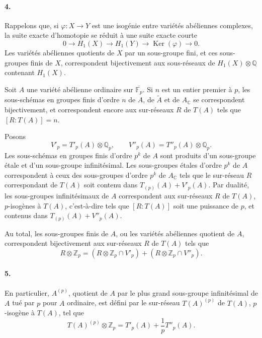 \documentclass[10pt]{article}
\newcommand{\C}{\mathbb C}
\newcommand{\Fp}{\mathbb F_p}
\newcommand{\Q}{\mathbb Q}
\newcommand{\Z}{\mathbb Z}
\newcommand{\Ac}{A_{\C}}
\newcommand{\Ker}{\operatorname{Ker}}
\begin{document}
\paragraph{4.} Rappelons que, si $\varphi:X\to Y$ est une isogénie entre variétés abéliennes complexes, la suite exacte d'homotopie se réduit à une suite exacte courte
\[
0\longrightarrow H_1(X)\longrightarrow H_1(Y)\longrightarrow\Ker(\varphi)\longrightarrow0.
\]
Les variétés abéliennes quotients de $X$ par un sous-groupe fini, et ces sous-groupes finis de $X$, correspondent bijectivement aux sous-réseaux de $H_1(X)\otimes\Q$ contenant $H_1(X)$.

Soit $A$ une variété abélienne ordinaire sur $\overline{\Fp}$. Si $n$ est un entier premier à $p$, les sous-schémas en groupes finis d'ordre $n$ de $A$, de $\widetilde A$ et de $\Ac$ se correspondent bijectivement, et correspondent encore aux sur-réseaux $R$ de $T(A)$ tels que $[R:T(A)]=n$.

Posons
\[
V'_p=T'_p(A)\otimes\Q_p,\qquad V''_p(A)=T''_p(A)\otimes\Q_p.
\]
Les sous-schémas en groupes finis d'ordre $p^k$ de $A$ sont produits d'un sous-groupe étale et d'un sous-groupe infinitésimal. Les sous-groupes étales d'ordre $p^k$ de $A$ correspondent à ceux des sous-groupes d'ordre $p^k$ de $\Ac$ tels que le sur-réseau $R$ correspondant de $T(A)$ soit contenu dans $T_{(p)}(A)+V'_p(A)$. Par dualité, les sous-groupes infinitésimaux de $A$ correspondent aux sur-réseaux $R$ de $T(A)$, $p$-isogènes à $T(A)$, c'est-à-dire tels que $[R:T(A)]$ soit une puissance de $p$, et contenus dans $T_{(p)}(A)+V''_p(A)$.

Au total, les sous-groupes finis de $A$, ou les variétés abéliennes quotient de $A$, correspondent bijectivement aux sur-réseaux $R$ de $T(A)$ tels que
\[
\tag{4.1}
R\otimes\Z_p=(R\otimes\Z_p\cap V'_p)+(R\otimes\Z_p\cap V''_p).
\]

\paragraph{5.} En particulier, $A^{(p)}$, quotient de $A$ par le plus grand sous-groupe infinitésimal de $A$ tué par $p$ pour $A$ ordinaire, est défini par le sur-réseau $T(A)^{(p)}$ de $T(A)$, $p$-isogène à $T(A)$, tel que
\[
T(A)^{(p)}\otimes\Z_p=T'_p(A)+\frac{1}{p}T''_p(A).
\]
\end{document}
